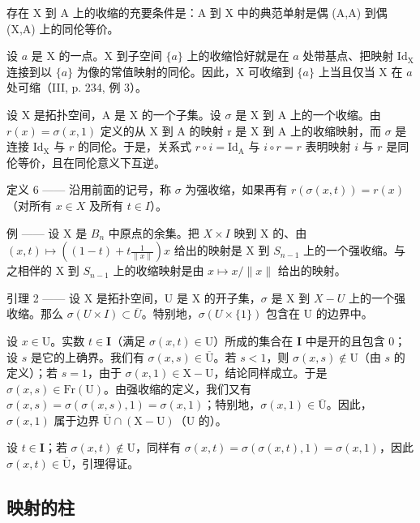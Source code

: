 存在 X 到 A 上的收缩的充要条件是：A 到 X 中的典范单射是偶 (A,A) 到偶 (X,A) 上的同伦等价。

设 \(a\) 是 X 的一点。X 到子空间 \(\{a\}\) 上的收缩恰好就是在 \(a\) 处带基点、把映射 \(\mathrm{Id}_{\mathrm{X}}\) 连接到以 \(\{a\}\) 为像的常值映射的同伦。因此，X 可收缩到 \(\{a\}\) 上当且仅当 X 在 \(a\) 处可缩（III, p. 234, 例 3）。

设 X 是拓扑空间，A 是 X 的一个子集。设 \(\sigma\) 是 X 到 A 上的一个收缩。由 \(r(x) = \sigma(x,1)\) 定义的从 X 到 A 的映射 r 是 X 到 A 上的收缩映射，而 \(\sigma\) 是连接 \(\mathrm{Id}_{\mathrm{X}}\) 与 \(r\) 的同伦。于是，关系式 \(r \circ i = \mathrm{Id}_{\mathrm{A}}\) 与 \(i \circ r = r\) 表明映射 \(i\) 与 \(r\) 是同伦等价，且在同伦意义下互逆。

定义 6 —— 沿用前面的记号，称 \(\sigma\) 为强收缩，如果再有 \(r(\sigma(x,t))=r(x)\)（对所有 \(x\in X\) 及所有 \(t\in I\)）。

例 —— 设 X 是 \(B_{n}\) 中原点的余集。把 \(X \times I\) 映到 X 的、由 \((x, t) \mapsto ((1 - t) + t \frac{1}{\|x\|})x\) 给出的映射是 X 到 \(S_{n-1}\) 上的一个强收缩。与之相伴的 X 到 \(S_{n-1}\) 上的收缩映射是由 \(x \mapsto x / \|x\|\) 给出的映射。

引理 2 —— 设 X 是拓扑空间，U 是 X 的开子集，\(\sigma\) 是 X 到 \(X-U\) 上的一个强收缩。那么 \(\sigma(U\times I)\subset\overline{U}\)。特别地，\(\sigma(U\times\{1\})\) 包含在 U 的边界中。

设 \(x \in \mathrm{U}\)。实数 \(t \in \mathbf{I}\)（满足 \(\sigma(x, t) \in \mathrm{U}\)）所成的集合在 \(\mathbf{I}\) 中是开的且包含 0；设 \(s\) 是它的上确界。我们有 \(\sigma(x, s) \in \overline{\mathrm{U}}\)。若 \(s < 1\)，则 \(\sigma(x, s) \notin \mathrm{U}\)（由 \(s\) 的定义）；若 \(s = 1\)，由于 \(\sigma(x, 1) \in \mathrm{X} - \mathrm{U}\)，结论同样成立。于是 \(\sigma(x, s) \in \mathrm{Fr}(\mathrm{U})\)。由强收缩的定义，我们又有 \(\sigma(x, s) = \sigma(\sigma(x, s), 1) = \sigma(x, 1)\)；特别地，\(\sigma(x, 1) \in \overline{\mathrm{U}}\)。因此，\(\sigma(x, 1)\) 属于边界 \(\overline{\mathrm{U}} \cap (\mathrm{X} - \mathrm{U})\)（\(\mathrm{U}\) 的）。

设 \(t \in \mathbf{I}\)；若 \(\sigma(x,t) \notin \mathrm{U}\)，同样有 \(\sigma(x,t) = \sigma(\sigma(x,t),1) = \sigma(x,1)\)，因此 \(\sigma(x,t) \in \overline{\mathrm{U}}\)，引理得证。

\subsection{映射的柱}


